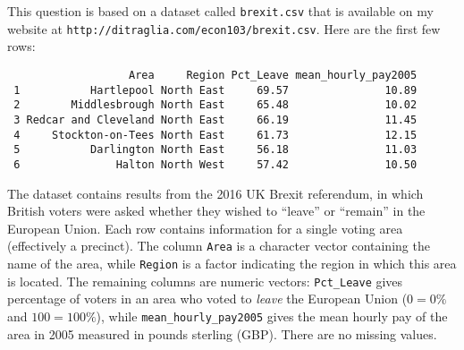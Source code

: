 \documentclass[addpoints,12pt]{exam}
\begin{document}
\begin{questions}

\question This question is based on a dataset called \texttt{brexit.csv} that is available on my website at \texttt{http://ditraglia.com/econ103/brexit.csv}. 
Here are the first few rows:
\begin{verbatim}
                   Area     Region Pct_Leave mean_hourly_pay2005
 1           Hartlepool North East     69.57               10.89
 2        Middlesbrough North East     65.48               10.02
 3 Redcar and Cleveland North East     66.19               11.45
 4     Stockton-on-Tees North East     61.73               12.15
 5           Darlington North East     56.18               11.03
 6               Halton North West     57.42               10.50
\end{verbatim}
The dataset contains results from the 2016 UK Brexit referendum, in which 
British voters were asked whether they wished to ``leave'' or ``remain'' in the European Union. 
Each row contains information for a single voting area (effectively a 
precinct). 
The column \texttt{Area} is a character vector containing the name of the 
area, while \texttt{Region} is a factor indicating the region in which this area is located.
The remaining columns are numeric vectors: \texttt{Pct\_Leave} gives percentage of voters in an area who voted to \emph{leave} the European Union ($0=0\%$ and $100=100\%$), while \texttt{mean\_hourly\_pay2005} gives the mean hourly pay of the area in 2005 measured in pounds sterling (GBP). 
There are no missing values.
\end{questions}
\end{document}
